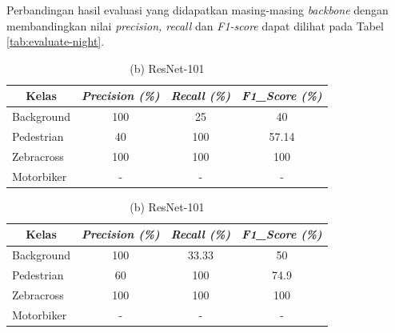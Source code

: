 Perbandingan hasil evaluasi yang didapatkan masing-masing \textit{backbone} dengan membandingkan nilai \textit{precision, recall} dan \textit{F1-score} dapat dilihat pada Tabel \ref{tab:evaluate-night}.

\begin{table}[!h]
	\centering
	\caption{{Perbandingan Hasil Evaluasi pada Malam Hari}}
	\begin{minipage}[b]{\textwidth}
		\centering
		\caption*{(a) ResNet-50}
		\begin{tabular}{|l|c|c|c|}
			\hline
			\multicolumn{1}{|c|}{\textbf{Kelas}} & \textit{\textbf{Precision (\%)}} & \textit{\textbf{Recall (\%)}} & \textit{\textbf{F1\_Score (\%)}} \\ \hline
			Background                           & 100                              & 25                            & 40                               \\ \hline
			Pedestrian                           & 40                               & 100                           & 57.14                            \\ \hline
			Zebracross                           & 100                              & 100                           & 100                              \\ \hline
			Motorbiker                           & -                                & -                             & -                                \\ \hline
		\end{tabular}	
		
	\end{minipage}
	\vfill
	\begin{minipage}[b]{\textwidth}
		\centering
		\caption*{(b) ResNet-101}
		\begin{tabular}{|l|c|c|c|}
			\hline
			\multicolumn{1}{|c|}{\textbf{Kelas}} & \textit{\textbf{Precision (\%)}} & \textit{\textbf{Recall (\%)}} & \textit{\textbf{F1\_Score (\%)}} \\ \hline
			Background                           & 100                              & 33.33                         & 50                               \\ \hline
			Pedestrian                           & 60                               & 100                           & 74.9                             \\ \hline
			Zebracross                           & 100                              & 100                           & 100                              \\ \hline
			Motorbiker                           & -                                & -                             & -                                \\ \hline
		\end{tabular}
		

\end{minipage}
\end{table}
